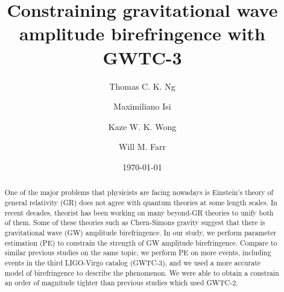 \documentclass[aps,prd,twocolumn,superscriptaddress,preprintnumbers,floatfix,nofootinbib]{revtex4-2}
\begin{document}
\title{Constraining gravitational wave amplitude birefringence with GWTC-3}

\author{Thomas C. K. Ng}

\author{Maximiliano Isi}

\author{Kaze W. K. Wong}

\author{Will M. Farr}

\date{\today}

\begin{abstract}
    One of the major problems that physicists are facing nowadays is Einstein's theory of general relativity (GR) does not agree with quantum theories at some length scales.
    In recent decades, theorist has been working on many beyond-GR theories to unify both of them.
    Some of these theories such as Chern-Simons gravity suggest that there is gravitational wave (GW) amplitude birefringence.
    In our study, we perform parameter estimation (PE) to constrain the strength of GW amplitude birefringence.
    Compare to similar previous studies on the same topic, we perform PE on more events, including events in the third LIGO-Virgo catalog (GWTC-3), and we used a more accurate model of birefringence to describe the phenomenon.
    We were able to obtain a constrain an order of magnitude tighter than previous studies which used GWTC-2.
\end{abstract}

\maketitle
\end{document}
